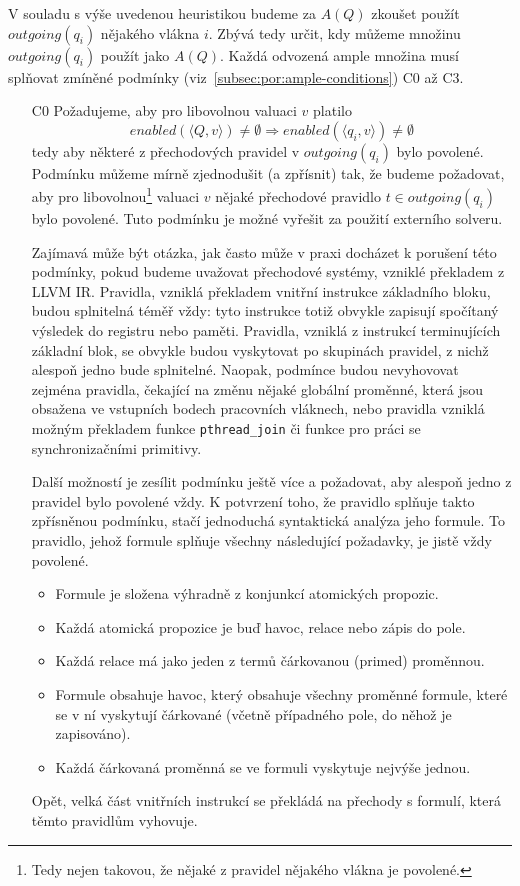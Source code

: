 \documentclass[12pt]{fithesis2}
\newcommand{\tuple}[1]{\langle #1 \rangle}
\begin{document}
V souladu s výše uvedenou heuristikou budeme za $A(Q)$ zkoušet použít $\mathit{outgoing}(q_i)$ nějakého vlákna $i$. Zbývá tedy určit, kdy můžeme množinu $\mathit{outgoing}(q_i)$ použít jako $A(Q)$. Každá odvozená ample množina musí splňovat zmíněné podmínky (viz~\ref{subsec:por:ample-conditions}) C0 až C3.
\begin{enumerate}
	\item[C0] Požadujeme, aby pro libovolnou valuaci $v$ platilo
	\begin{equation}
	\mathit{enabled}(\tuple{Q,v}) \neq \emptyset \Rightarrow \mathit{enabled}(\tuple{q_i,v}) \neq \emptyset
	\end{equation}		
	tedy aby některé z přechodových pravidel v $\mathit{outgoing}(q_i)$ bylo povolené. Podmínku můžeme mírně zjednodušit (a zpřísnit) tak, že budeme požadovat, aby pro libovolnou\footnote{Tedy nejen takovou, že nějaké z pravidel nějakého vlákna je povolené.} valuaci $v$ nějaké přechodové pravidlo $t \in \mathit{outgoing}(q_i)$ bylo povolené. Tuto podmínku je možné vyřešit za použití externího solveru.

	Zajímavá může být otázka, jak často může v praxi docházet k porušení této podmínky, pokud budeme uvažovat přechodové systémy, vzniklé překladem z LLVM IR. Pravidla, vzniklá překladem vnitřní instrukce základního bloku, budou splnitelná téměř vždy: tyto instrukce totiž obvykle zapisují spočítaný výsledek do registru nebo paměti. Pravidla, vzniklá z instrukcí terminujících základní blok, se obvykle budou vyskytovat po skupinách pravidel, z nichž alespoň jedno bude splnitelné. Naopak, podmínce budou nevyhovovat zejména pravidla, čekající na změnu nějaké globální proměnné, která jsou obsažena ve vstupních bodech pracovních vláknech, nebo pravidla vzniklá možným překladem funkce \texttt{pthread\_join} či funkce pro práci se synchronizačními primitivy.

	Další možností je zesílit podmínku ještě více a požadovat, aby alespoň jedno z pravidel bylo povolené vždy. K potvrzení toho, že pravidlo splňuje takto zpřísněnou podmínku, stačí jednoduchá syntaktická analýza jeho formule. To pravidlo, jehož formule splňuje všechny následující požadavky, je jistě vždy povolené.
	\begin{itemize}
		\item Formule je složena výhradně z konjunkcí atomických propozic.
		\item Každá atomická propozice je buď havoc, relace nebo zápis do pole.
		\item Každá relace má jako jeden z termů čárkovanou (primed) proměnnou.
		\item Formule obsahuje havoc, který obsahuje všechny proměnné formule, které se v ní vyskytují čárkované (včetně případného pole, do něhož je zapisováno).
		\item Každá čárkovaná proměnná se ve formuli vyskytuje nejvýše jednou.
	\end{itemize}
	Opět, velká část vnitřních instrukcí se překládá na přechody s formulí, která těmto pravidlům vyhovuje.


\end{enumerate}
\end{document}
